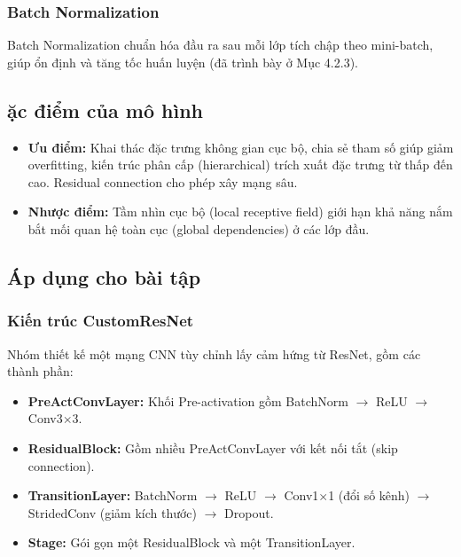 \documentclass[a4paper]{article}
\theoremstyle{definition}
\begin{document}
\subsubsection{Batch Normalization}
Batch Normalization \cite{ioffe2015batch} chuẩn hóa đầu ra sau mỗi lớp tích chập theo mini-batch, giúp ổn định và tăng tốc huấn luyện (đã trình bày ở Mục 4.2.3).

\subsection{\DJ ặc điểm của mô hình}
\begin{itemize}
	\item \textbf{Ưu điểm:} Khai thác đặc trưng không gian cục bộ, chia sẻ tham số giúp giảm overfitting, kiến trúc phân cấp (hierarchical) trích xuất đặc trưng từ thấp đến cao. Residual connection cho phép xây mạng sâu.
	\item \textbf{Nhược điểm:} Tầm nhìn cục bộ (local receptive field) giới hạn khả năng nắm bắt mối quan hệ toàn cục (global dependencies) ở các lớp đầu.
\end{itemize}

\subsection{Áp dụng cho bài tập}

\subsubsection{Kiến trúc CustomResNet}
Nhóm thiết kế một mạng CNN tùy chỉnh lấy cảm hứng từ ResNet, gồm các thành phần:

\begin{itemize}
	\item \textbf{PreActConvLayer:} Khối Pre-activation gồm BatchNorm $\to$ ReLU $\to$ Conv3$\times$3.
	\item \textbf{ResidualBlock:} Gồm nhiều PreActConvLayer với kết nối tắt (skip connection).
	\item \textbf{TransitionLayer:} BatchNorm $\to$ ReLU $\to$ Conv1$\times$1 (đổi số kênh) $\to$ StridedConv (giảm kích thước) $\to$ Dropout.
	\item \textbf{Stage:} Gói gọn một ResidualBlock và một TransitionLayer.
\end{itemize}
\end{document}
